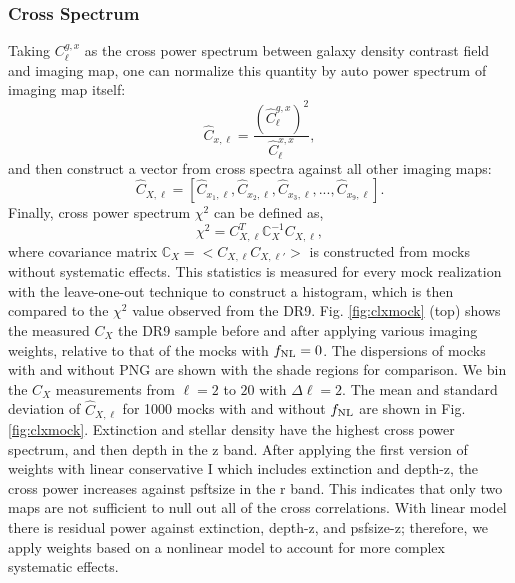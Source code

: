 \subsubsection{Cross Spectrum}
Taking $C^{g,x}_{\ell}$ as the cross power spectrum between galaxy density contrast field and imaging map, one can normalize this quantity by auto power spectrum of imaging map itself:
\begin{equation}
\hat{C}_{x, \ell} = \frac{(\hat{C}^{g,x}_{\ell})^{2}}{\hat{C}^{x,x}_{\ell}},
\end{equation}
and then construct a vector from cross spectra against all other imaging maps:
\begin{equation}
\hat{C}_{X, \ell} = [\hat{C}_{x_{1}, \ell}, \hat{C}_{x_{2}, \ell}, \hat{C}_{x_{3}, \ell}, ..., \hat{C}_{x_{9}, \ell}].
\end{equation}
Finally, cross power spectrum $\chi^{2}$ can be defined as,
\begin{equation}
\chi^{2} = C^{T}_{X, \ell} \mathbb{C}_{X}^{-1} C_{X, \ell},
\end{equation}
where covariance matrix $\mathbb{C}_{X} = < C_{X, \ell} C_{X, \ell'} >$ is constructed from mocks without systematic effects. This statistics is measured for every mock realization with the leave-one-out technique to construct a histogram, which is then compared to the $\chi^{2}$ value observed from the DR9.  Fig. \ref{fig:clxmock} (top) shows the measured $C_{X}$ the DR9 sample before and after applying various imaging weights, relative to that of the mocks with $f_{\rm NL}=0$. The dispersions of mocks with and without PNG are shown with the shade regions for comparison. We bin the $C_{X}$ measurements from $\ell=2$ to $20$ with $\Delta\ell=2$. The mean and standard deviation of $\hat{C}_{X, \ell}$ for 1000 mocks with and without $f_{\rm NL}$ are shown in Fig. \ref{fig:clxmock}.  Extinction and stellar density have the highest cross power spectrum, and then depth in the z band. After applying the first version of weights with linear conservative I which includes extinction and depth-z, the cross power increases against psftsize in the r band. This indicates that only two maps are not sufficient to null out all of the cross correlations. With linear model there is residual power against extinction, depth-z, and psfsize-z; therefore, we apply weights based on a nonlinear model to account for more complex systematic effects. 

